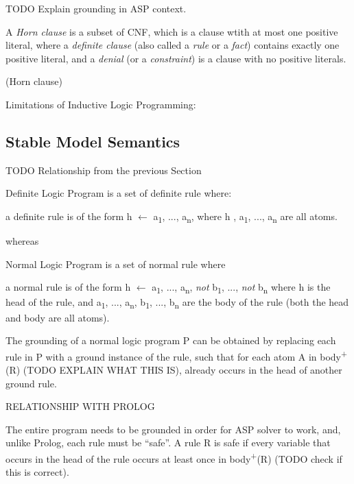 \documentclass[12pt,twoside]{report}
\begin{document}
TODO Explain grounding in ASP context.


A \textit{Horn clause} is a subset of CNF, which is a clause wtith at most one positive literal, where a \textit{definite clause} (also called a \textit{rule} or a \textit{fact}) contains exactly one positive literal, and a \textit{denial} (or a \textit{constraint}) is a clause with no positive literals.

\begin{examp} (Horn clause)

\end{examp}



Limitations of Inductive Logic Programming:

\subsection{Stable Model Semantics}

TODO Relationship from the previous Section

Definite Logic Program is a set of definite rule where: \newline

a definite rule is of the form h $\leftarrow$ a\textsubscript{1}, ..., a\textsubscript{n}, where h , a\textsubscript{1}, ..., a\textsubscript{n} are all atoms.

whereas

Normal Logic Program is a set of normal rule where

a normal rule is of the form h $\leftarrow$ a\textsubscript{1}, ..., a\textsubscript{n}, \textit{not} b\textsubscript{1}, ..., \textit{not}  b\textsubscript{n} where h is the head of the rule,
 and a\textsubscript{1}, ..., a\textsubscript{n}, b\textsubscript{1}, ..., b\textsubscript{n} are the body of the rule (both the head and body are all atoms).


The grounding of a normal logic program P can be obtained by replacing each rule in P with a ground instance of the rule, such that for each atom A in body\textsuperscript{+} (R) (TODO EXPLAIN WHAT THIS IS), already occurs in the head of another ground rule.


RELATIONSHIP WITH PROLOG

The entire program needs to be grounded in order for ASP solver to work, and, unlike Prolog,  each rule must be \enquote{safe}. A rule R is safe if every variable that occurs in the head of the rule occurs at least once in body\textsuperscript{+}(R) (TODO check if this is correct).
\end{document}
